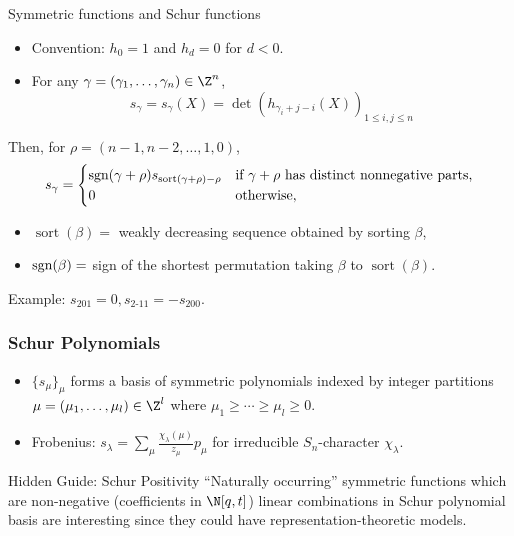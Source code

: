 \documentclass[dvipsnames]{beamer}
\newcommand{\sgn}{\text{\rm sgn}}
\DeclareMathOperator{\sort}{sort}
\theoremstyle{definition}
\begin{document}
\begin{frame}{Symmetric functions and Schur functions}
  \begin{itemize}
  \item Convention: \(h_0 = 1\) and \(h_d = 0\) for \(d < 0\).
  \item For any \(\gamma = (\gamma_1,\ldots,\gamma_n) \in \Z^n \),
    \[
      s_\gamma = s_\gamma(X) = \det(h_{\gamma_i+j-i}(X))_{1 \leq i,j
        \leq n}
    \] \pause
  \end{itemize}
  Then, for \(\rho = (n-1,n-2, \ldots, 1,0)\),
  \[
    s_\gamma = 
\begin{cases}
\sgn(\gamma+\rho) s_{\sort(\gamma+\rho) -\rho} & \text{if $\gamma +
                                                 \rho$ has distinct
                                                 nonnegative parts,}\\
0                                                          & \text{otherwise,}
\end{cases}
  \]
\begin{itemize}
\item $\sort(\beta) = $ weakly decreasing sequence obtained by sorting $\beta$,
\vspace{-1mm}
\item $\sgn(\beta) =$ sign of the shortest permutation taking $\beta$ to $\sort(\beta)$.
\end{itemize} \pause
Example: \(s_{201} = 0, s_{2\text{-}11} = -s_{200}\).
\end{frame}
\begin{frame}
  \frametitle{Schur Polynomials}
  \begin{itemize}\pause
  \item \(\{s_\mu\}_\mu\) forms a basis of symmetric polynomials indexed by integer partitions
    \(\mu = (\mu_1,\ldots,\mu_l) \in \Z^l\) where \(\mu_1 \geq \cdots \geq
    \mu_l \geq 0\).\pause
  \item Frobenius: \(s_\lambda = \sum_\mu \frac{\chi_\lambda(\mu)}{z_\mu} p_\mu\) for
    irreducible \(S_n\)-character \(\chi_\lambda\). \pause
  \end{itemize}
  \begin{block}{Hidden Guide: Schur Positivity}
    ``Naturally occurring'' symmetric functions which are non-negative
    (coefficients in \(\N[q,t]\))
    linear combinations in Schur polynomial basis
     are interesting since they could have representation-theoretic models.
  \end{block}
\end{frame}
\end{document}
